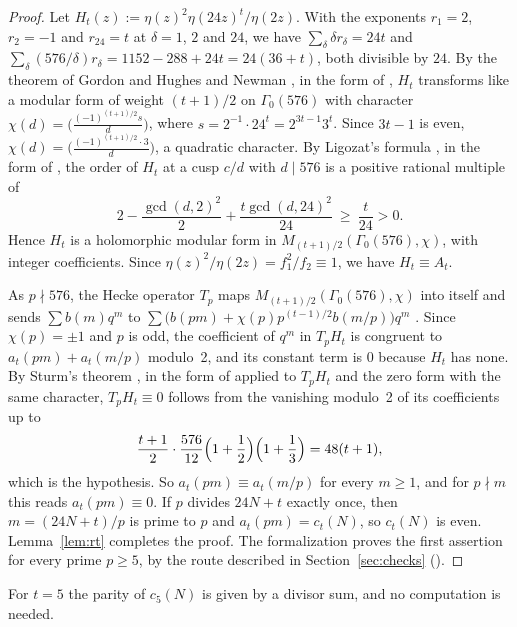 \documentclass[12pt]{amsart}
\theoremstyle{definition}
\begin{document}
\begin{proof}
Let $H_t(z):=\eta(z)^2\eta(24z)^t/\eta(2z)$. With the exponents $r_1=2$, $r_2=-1$ and $r_{24}=t$ at $\delta=1$, $2$ and $24$, we have $\sum_\delta\delta r_\delta=24t$ and $\sum_\delta(576/\delta)r_\delta=1152-288+24t=24(36+t)$, both divisible by $24$. By the theorem of Gordon and Hughes \cite{GH} and Newman \cite{New}, in the form of \cite[Theorem~20]{KZ1}, $H_t$ transforms like a modular form of weight $(t+1)/2$ on $\Gamma_0(576)$ with character $\chi(d)=\bigl(\frac{(-1)^{(t+1)/2}s}{d}\bigr)$, where $s=2^{-1}\cdot24^t=2^{3t-1}3^t$. Since $3t-1$ is even, $\chi(d)=\bigl(\frac{(-1)^{(t+1)/2}\cdot3}{d}\bigr)$, a quadratic character. By Ligozat's formula \cite{Lig}, in the form of \cite[Theorem~23]{KZ1}, the order of $H_t$ at a cusp $c/d$ with $d\mid576$ is a positive rational multiple of
\[
2-\frac{\gcd(d,2)^2}{2}+\frac{t\gcd(d,24)^2}{24}\ \ge\ \frac{t}{24}>0 .
\]
Hence $H_t$ is a holomorphic modular form in $M_{(t+1)/2}(\Gamma_0(576),\chi)$, with integer coefficients. Since $\eta(z)^2/\eta(2z)=f_1^2/f_2\equiv1$, we have $H_t\equiv A_t$.

As $p\nmid576$, the Hecke operator $T_p$ maps $M_{(t+1)/2}(\Gamma_0(576),\chi)$ into itself and sends $\sum b(m)q^m$ to $\sum\bigl(b(pm)+\chi(p)p^{(t-1)/2}b(m/p)\bigr)q^m$ \cite[Section~3.1]{KZ1}. Since $\chi(p)=\pm1$ and $p$ is odd, the coefficient of $q^m$ in $T_pH_t$ is congruent to $a_t(pm)+a_t(m/p)$ modulo~2, and its constant term is $0$ because $H_t$ has none. By Sturm's theorem \cite{Sturm}, in the form of \cite[Theorem~22]{KZ1} applied to $T_pH_t$ and the zero form with the same character, $T_pH_t\equiv0$ follows from the vanishing modulo~2 of its coefficients up to
\[
\frac{t+1}{2}\cdot\frac{576}{12}\Bigl(1+\frac12\Bigr)\Bigl(1+\frac13\Bigr)=48(t+1),
\]
which is the hypothesis. So $a_t(pm)\equiv a_t(m/p)$ for every $m\ge1$, and for $p\nmid m$ this reads $a_t(pm)\equiv0$. If $p$ divides $24N+t$ exactly once, then $m=(24N+t)/p$ is prime to $p$ and $a_t(pm)=c_t(N)$, so $c_t(N)$ is even. Lemma~\ref{lem:rt} completes the proof. The formalization proves the first assertion for every prime $p\ge5$, by the route described in Section~\ref{sec:checks} ().
\end{proof}

For $t=5$ the parity of $c_5(N)$ is given by a divisor sum, and no computation is needed.
\end{document}
